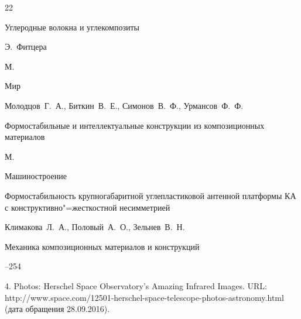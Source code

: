 \begin{thebibliography}{22}





\book Углеродные волокна и углекомпозиты

\ed Э.~Фитцера

\publaddr М.

\publ Мир







\by Молодцов~Г.~А., Биткин~В.~Е., Симонов~В.~Ф., Урмансов~Ф.~Ф.

\book Формостабильные и интеллектуальные конструкции из композиционных материалов

\publaddr М.

\publ Машиностроение







\paper Формостабильность крупногабаритной углепластиковой антенной платформы КА с конструктивно"=жесткостной несимметрией

\by Климакова~Л.~А., Половый~А.~О., Зельнев~В.~Н.

\jour Механика композиционных материалов и конструкций




--254



4. Photos: Herschel Space Observatory's Amazing Infrared Images. URL: http://www.space.com/12501-herschel-space-telescope-photos-astronomy.html (дата обращения 28.09.2016).




\end{thebibliography}
